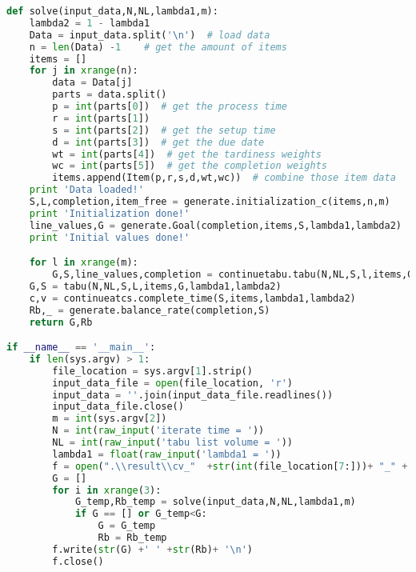 \begin{lstlisting}[language = Python]
def solve(input_data,N,NL,lambda1,m):
	lambda2 = 1 - lambda1
	Data = input_data.split('\n')  # load data
	n = len(Data) -1    # get the amount of items
	items = []
	for j in xrange(n):
		data = Data[j]
		parts = data.split()
		p = int(parts[0])  # get the process time
		r = int(parts[1])
		s = int(parts[2])  # get the setup time
		d = int(parts[3])  # get the due date
		wt = int(parts[4])  # get the tardiness weights
		wc = int(parts[5])  # get the completion weights
		items.append(Item(p,r,s,d,wt,wc))  # combine those item data
	print 'Data loaded!'	
	S,L,completion,item_free = generate.initialization_c(items,n,m)
	print 'Initialization done!'
	line_values,G = generate.Goal(completion,items,S,lambda1,lambda2)
	print 'Initial values done!'

	for l in xrange(m):
		G,S,line_values,completion = continuetabu.tabu(N,NL,S,l,items,G,completion,line_values,lambda1,lambda2)
	G,S = tabu(N,NL,S,L,items,G,lambda1,lambda2)
	c,v = continueatcs.complete_time(S,items,lambda1,lambda2)
	Rb,_ = generate.balance_rate(completion,S)
	return G,Rb

if __name__ == '__main__':
	if len(sys.argv) > 1:
		file_location = sys.argv[1].strip()
		input_data_file = open(file_location, 'r')
		input_data = ''.join(input_data_file.readlines())
		input_data_file.close()
		m = int(sys.argv[2])
		N = int(raw_input('iterate time = '))
		NL = int(raw_input('tabu list volume = '))
		lambda1 = float(raw_input('lambda1 = '))
		f = open(".\\result\\cv_"  +str(int(file_location[7:]))+ "_" + str(m) + "_" + str(lambda1),'w')
		G = []
		for i in xrange(3):
			G_temp,Rb_temp = solve(input_data,N,NL,lambda1,m)
			if G == [] or G_temp<G:
				G = G_temp
				Rb = Rb_temp
		f.write(str(G) +' ' +str(Rb)+ '\n')
		f.close()
\end{lstlisting}